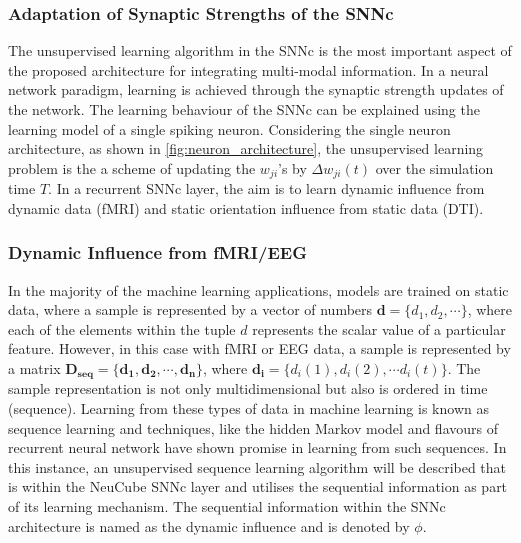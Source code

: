 \subsubsection{Adaptation of Synaptic Strengths of the SNNc}
\label{subsec:SNNc_learning}
The unsupervised learning algorithm in the SNNc is the most important aspect of the proposed architecture for integrating multi-modal information. In a neural network paradigm, learning is achieved through the synaptic strength updates of the network. The learning behaviour of the SNNc can be explained using the learning model of a single spiking neuron. Considering the single neuron architecture, as shown in \figurename \ref{fig:neuron_architecture}, the unsupervised learning problem is the a scheme of updating the $w_{ji}$'s by $\Delta w_{ji}(t)$ over the simulation time $T$. In a recurrent SNNc layer, the aim is to learn dynamic influence from dynamic data (fMRI) and static orientation influence from static data (DTI).  


\subsubsection{Dynamic Influence from fMRI/EEG}
\label{subsec:phi}

In the majority of the machine learning applications, models are trained on static data, where a sample is represented by a vector of numbers $\mathbf{d}=\{d_1,d_2,\cdots\}$, where each of the elements within the tuple $d$ represents the scalar value of a particular feature. However, in this case with fMRI or EEG data, a sample is represented by a matrix $\mathbf{D_{seq}=\{d_1, d_2,\cdots, d_n\}}$, where $\mathbf{d_i}=\{d_i(1), d_i(2),\cdots d_i(t)\}$. The sample representation is not only multidimensional but also is ordered in time (sequence). Learning from these types of data in machine learning is known as sequence learning and techniques, like the hidden Markov model and flavours of recurrent neural network have shown promise in learning from such sequences. In this instance, an unsupervised sequence learning algorithm will be described that is within the NeuCube SNNc layer and utilises the sequential information as part of its learning mechanism. The sequential information within the SNNc architecture is named as the dynamic influence and is denoted by $\phi$.        

